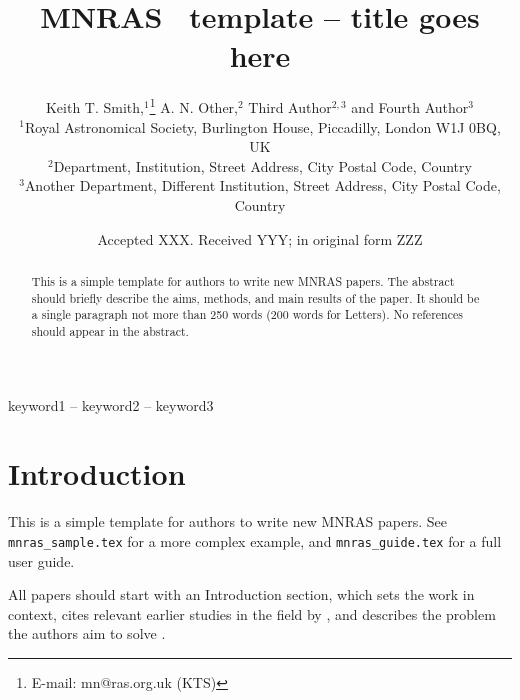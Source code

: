 \documentclass[a4paper,fleqn,usenatbib]{mnras}
\title[Short title, max. 45 characters]{MNRAS \LaTeXe\ template -- title goes here}
\author[K. T. Smith et al.]{
Keith T. Smith,$^{1}$\thanks{E-mail: mn@ras.org.uk (KTS)}
A. N. Other,$^{2}$
Third Author$^{2,3}$
and Fourth Author$^{3}$
\\
$^{1}$Royal Astronomical Society, Burlington House, Piccadilly, London W1J 0BQ, UK\\
$^{2}$Department, Institution, Street Address, City Postal Code, Country\\
$^{3}$Another Department, Different Institution, Street Address, City Postal Code, Country
}
\date{Accepted XXX. Received YYY; in original form ZZZ}
\begin{document}
\label{firstpage}
\pagerange{\pageref{firstpage}--\pageref{lastpage}}
\maketitle

\begin{abstract}
This is a simple template for authors to write new MNRAS papers.
The abstract should briefly describe the aims, methods, and main results of the paper.
It should be a single paragraph not more than 250 words (200 words for Letters).
No references should appear in the abstract.
\end{abstract}

\begin{keywords}
keyword1 -- keyword2 -- keyword3
\end{keywords}



\section{Introduction}

This is a simple template for authors to write new MNRAS papers.
See \texttt{mnras\_sample.tex} for a more complex example, and \texttt{mnras\_guide.tex}
for a full user guide.

All papers should start with an Introduction section, which sets the work
in context, cites relevant earlier studies in the field by \citet{Others2013},
and describes the problem the authors aim to solve \citep[e.g.][]{Author2012}.
\end{document}
